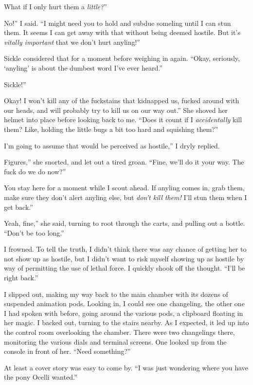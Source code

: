 \leavevmode{}What if I only hurt them a \textit{little?}”

\leavevmode{}No!” I said. “I might need you to hold and subdue someling until I can stun them. It seems I can get away with that without being deemed hostile. But it’s \textit{vitally important} that we don’t hurt anyling!”

Sickle considered that for a moment before weighing in again. “Okay, seriously, ‘anyling’ is about the dumbest word I’ve ever heard.”

\leavevmode{}Sickle!”

\leavevmode{}Okay! I won’t kill any of the fuckstains that kidnapped us, fucked around with our heads, and will probably try to kill us on our way out.” She shoved her helmet into place before looking back to me. “Does it count if I \textit{accidentally} kill them? Like, holding the little bugs a bit too hard and squishing them?”

\leavevmode{}I’m going to assume that would be perceived as hostile,” I dryly replied.

\leavevmode{}Figures,” she snorted, and let out a tired groan. “Fine, we’ll do it your way. The fuck do we do now?”

\leavevmode{}You stay here for a moment while I scout ahead. If anyling comes in, grab them, make sure they don’t alert anyling else, but \textit{don’t kill them!} I’ll stun them when I get back.”

\leavevmode{}Yeah, fine,” she said, turning to root through the carts, and pulling out a bottle. “Don’t be too long.”

I frowned. To tell the truth, I didn’t think there was any chance of getting her to not show up as hostile, but I didn’t want to risk myself showing up as hostile by way of permitting the use of lethal force. I quickly shook off the thought. “I’ll be right back.”

I slipped out, making my way back to the main chamber with its dozens of suspended animation pods. Looking in, I could see one changeling, the other one I had spoken with before, going around the various pods, a clipboard floating in her magic. I backed out, turning to the stairs nearby. As I expected, it led up into the control room overlooking the chamber. There were two changelings there, monitoring the various dials and terminal screens. One looked up from the console in front of her. “Need something?”

At least a cover story was easy to come by. “I was just wondering where you have the pony Ocelli wanted.”

